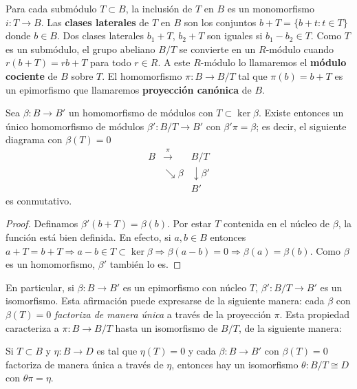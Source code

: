 Para cada submódulo $T \subset B$, la inclusión de $T$ en $B$ es un monomorfismo $i: T \rightarrow B$. Las \textbf{clases laterales} de $T$ en $B$ son los conjuntos $b + T = \{b + t : t \in T\}$ donde $b \in B$. Dos clases laterales $b_1 + T$, $b_2 + T$ son iguales si $b_1 - b_2 \in T$. Como $T$ es un submódulo, el grupo abeliano $B/T$ se convierte en un $R$-módulo cuando $r(b+T) = rb + T$ para todo $r \in R$. A este $R$-módulo lo llamaremos el \textbf{módulo cociente} de $B$ sobre $T$. El homomorfismo $\pi: B \rightarrow B/T$ tal que $\pi(b) = b + T$ es un epimorfismo que llamaremos \textbf{proyección canónica} de $B$.

\begin{proposicion}\label{prop:first_iso}

Sea \( \beta: B \rightarrow B' \) un homomorfismo de módulos con \( T \subset \ker \beta \). Existe entonces un único homomorfismo de módulos \( \beta': B/T \rightarrow B' \) con \( \beta'\pi = \beta \); es decir, el siguiente diagrama con \( \beta(T) = 0 \)
\[
\begin{array}{ccc}
	B & \stackrel{\pi}{\longrightarrow} & B/T \\
	& \searrow \beta & \downarrow \beta' \\
	& & B'
\end{array}
\]
es conmutativo.
\end{proposicion}

\begin{proof}
Definamos \( \beta'(b + T) = \beta(b) \). Por estar $T$ contenida en el núcleo de $\beta$, la función está bien definida. En efecto, si $a,b \in B$ entonces $a+T = b+T \Rightarrow a-b \in T \subset \ker \beta \Rightarrow \beta(a-b) = 0 \Rightarrow \beta(a)=\beta(b)$. Como $\beta$ es un homomorfismo, $\beta'$ también lo es.
\end{proof}

En particular, si \( \beta: B \rightarrow B' \) es un epimorfismo con núcleo \( T \), \( \beta': B/T \rightarrow B' \) es un isomorfismo. Esta afirmación puede expresarse de la siguiente manera: cada \( \beta \) con \( \beta(T) = 0 \) \textit{factoriza de manera única} a través de la proyección \( \pi \). Esta propiedad caracteriza a \( \pi: B \rightarrow B/T \) hasta un isomorfismo de \( B/T \), de la siguiente manera:

\begin{proposicion}
	Si \( T \subset B \) y \( \eta: B \rightarrow D \) es tal que \( \eta(T) = 0 \) y cada \( \beta: B \rightarrow B' \) con \( \beta(T) = 0 \) factoriza de manera única a través de \( \eta \), entonces hay un isomorfismo \( \theta: B/T \cong D \) con \( \theta \pi = \eta \).
\end{proposicion}

